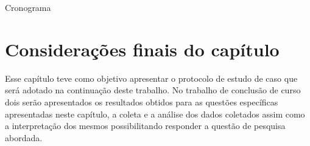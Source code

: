 \begin{table}[!ht]
	\begin{center}
	 
	\caption{Cronograma}
	\label{tab:cronograma}
	\end{center}
	\end{table}	
	\FloatBarrier


\section{Considerações finais do capítulo}

Esse capítulo teve como objetivo apresentar o protocolo de estudo de caso que será adotado na continuação deste trabalho. No trabalho de conclusão de curso dois serão apresentados os resultados obtidos para as questões específicas apresentadas neste capítulo, a coleta e a análise dos dados coletados assim como a interpretação dos mesmos possibilitando responder a questão de pesquisa abordada.  